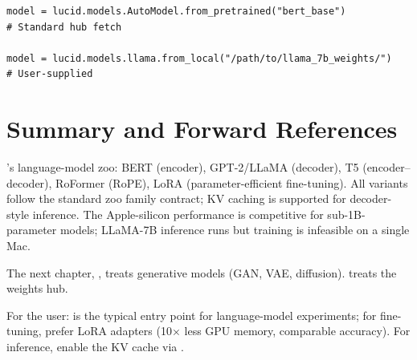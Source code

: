 \begin{lstlisting}[style=lucid,language=LucidPython]
model = lucid.models.AutoModel.from_pretrained("bert_base")
# Standard hub fetch

model = lucid.models.llama.from_local("/path/to/llama_7b_weights/")
# User-supplied
\end{lstlisting}

\section{Summary and Forward References}
\label{sec:language_models:summary}

\Lucid's language-model zoo: BERT (encoder), GPT-2/LLaMA
(decoder), T5 (encoder--decoder), RoFormer (RoPE), LoRA
(parameter-efficient fine-tuning). All variants follow the
standard zoo family contract; KV caching is supported for
decoder-style inference. The Apple-silicon performance is
competitive for sub-1B-parameter models; LLaMA-7B inference
runs but training is infeasible on a single Mac.

The next chapter, , treats generative
models (GAN, VAE, diffusion).  treats the
weights hub.

\begin{lucidnote}
For the user:  is the typical entry point for
language-model experiments; for fine-tuning, prefer LoRA
adapters (10$\times$ less GPU memory, comparable accuracy). For
inference, enable the KV cache via .
\end{lucidnote}
